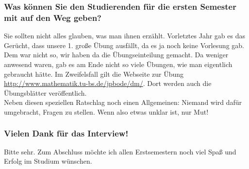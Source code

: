 \begin{multicols}{2}
	\subsubsection{Was können Sie den Studierenden für die ersten Semester mit auf den Weg geben?}
		Sie sollten  nicht alles glauben, was man ihnen erzählt. Vorletztes Jahr gab es das Gerücht, dass unsere 1. große Übung ausfällt, da es ja noch keine Vorlesung gab. Dem war nicht so, wir haben da die Übungseinteilung gemacht. Da weniger anwesend waren, gab es am Ende nicht so viele Übungen, wie man eigentlich gebraucht hätte. Im Zweifelsfall gilt die Webseite zur Übung \url{http://www.mathematik.tu-bs.de/jpbode/dm/}. Dort werden auch die Übungsblätter veröffentlich.\\ Neben diesen speziellen Ratschlag noch einen Allgemeinen: Niemand wird dafür umgebracht, Fragen zu stellen. Wenn also etwas unklar ist, nur Mut!

	\subsubsection{Vielen Dank für das Interview!}
		Bitte sehr. Zum Abschluss möchte ich allen Erstsemestern noch viel Spaß und Erfolg im Studium wünschen.
\end{multicols}
